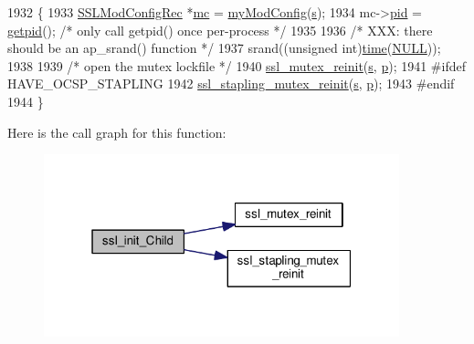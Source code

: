 \begin{DoxyCode}
1932 \{
1933     \hyperlink{structSSLModConfigRec}{SSLModConfigRec} *\hyperlink{group__APR__Util__MC_ga1cf8c9d89cfb411f224cae715e8c2aaa}{mc} = \hyperlink{group__MOD__SSL__PRIVATE_ga94fd702ebef715ed37309b2be90c68e8}{myModConfig}(\hyperlink{group__APACHE__CORE__LISTEN_ga9359ed159c8b295541e3770172d34550}{s});
1934     mc->\hyperlink{structSSLModConfigRec_a502680db48a6c7c3c15f880873fae223}{pid} = \hyperlink{group__APACHE__OS__NETWARE_gacf2940fe9f29eb438f40629fd4fbb2b6}{getpid}(); \textcolor{comment}{/* only call getpid() once per-process */}
1935 
1936     \textcolor{comment}{/* XXX: there should be an ap\_srand() function */}
1937     srand((\textcolor{keywordtype}{unsigned} \textcolor{keywordtype}{int})\hyperlink{pcre_8txt_aafdc0b2481cb13eb2e0183db31aa1c5d}{time}(\hyperlink{pcre_8txt_ad7f989d16aa8ca809a36bc392c07fba1}{NULL}));
1938 
1939     \textcolor{comment}{/* open the mutex lockfile */}
1940     \hyperlink{group__MOD__SSL__PRIVATE_gaf38e242d1b97fdc9e7150ebd3431a553}{ssl\_mutex\_reinit}(\hyperlink{group__APACHE__CORE__LISTEN_ga9359ed159c8b295541e3770172d34550}{s}, \hyperlink{group__APACHE__CORE__MPM_ga5cd91701e5c167f2b1a38e70ab57817e}{p});
1941 \textcolor{preprocessor}{#ifdef HAVE\_OCSP\_STAPLING}
1942     \hyperlink{group__MOD__SSL__PRIVATE_gaac57b6fd1127ac6aa3c4829b41947183}{ssl\_stapling\_mutex\_reinit}(\hyperlink{group__APACHE__CORE__LISTEN_ga9359ed159c8b295541e3770172d34550}{s}, \hyperlink{group__APACHE__CORE__MPM_ga5cd91701e5c167f2b1a38e70ab57817e}{p});
1943 \textcolor{preprocessor}{#endif}
1944 \}
\end{DoxyCode}


Here is the call graph for this function\+:
\nopagebreak
\begin{figure}[H]
\begin{center}
\leavevmode
\includegraphics[width=292pt]{group__MOD__SSL__PRIVATE_gae2c49d9210f335cb8066ef6c07313483_cgraph}
\end{center}
\end{figure}




